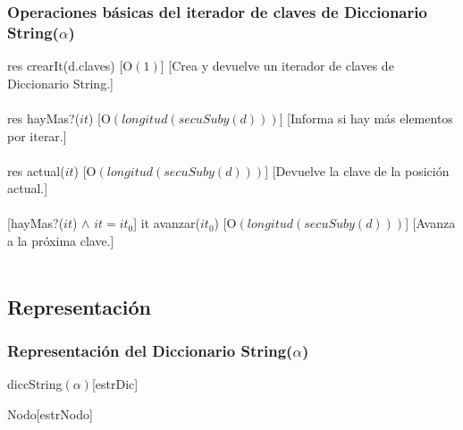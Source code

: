  \subsubsection{Operaciones b\'asicas del iterador de claves de Diccionario String($\alpha$)}
  {res \igobs crearIt(d.claves) }
  [O$(1)$]
  [Crea y devuelve un iterador de claves de Diccionario String.]\\\\

  {res \igobs hayMas?($it$)}%
  [O$(longitud(secuSuby(d)))$] %
  [Informa si hay m\'as elementos por iterar.]\\\\

  {res \igobs actual($it$)}
  [O$(longitud(secuSuby(d)))$]%
  [Devuelve la clave de la posici\'on actual.]\\\\

  [hayMas?($it$) $\land$ $it = it_{0}$] %
  {it \igobs avanzar($it_{0}$)}
  [O$(longitud(secuSuby(d)))$]%
  [Avanza a la pr\'oxima clave.]\\\\


\subsection{Representaci\'on}
  
  \subsubsection{Representaci\'on del Diccionario String($\alpha$)}
  \begin{Estructura}{diccString$(\alpha)$}[estrDic]
    \begin{Tupla}[estrDic]
    \end{Tupla}
\end{Estructura}

  \begin{Estructura}{Nodo}[estrNodo]
    \begin{Tupla}[estrNodo]
    \end{Tupla}
\end{Estructura}

